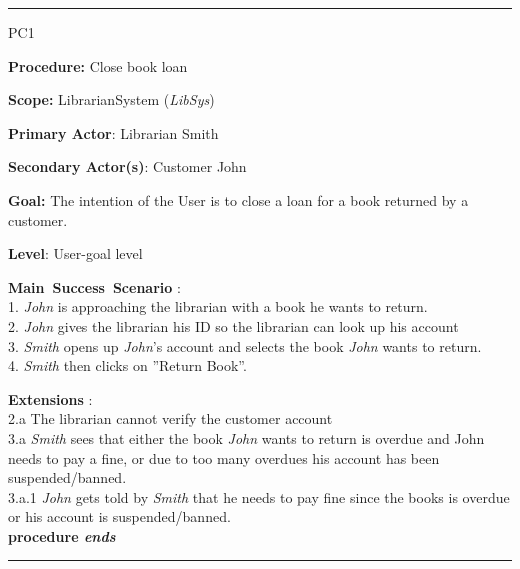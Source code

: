\vspace{0.5cm}
\hrule
\begin{lyxlist}{PC1}
\small{
\item [\textbf{Procedure:}] Close book loan
\item [\textbf{Scope:}] LibrarianSystem (\emph{LibSys})
\item [\textbf{Primary Actor}:] Librarian Smith
\item [\textbf{Secondary Actor(s)}:] Customer John
\item [\textbf{Goal:}] The intention of the User is to close a loan for a book
returned by a customer.
\item [\textbf{Level}:] User-goal level
\item [\textbf{Main~Success~Scenario}]:\\
1. \emph{John} is approaching the librarian with a book he wants to return. \\
2. \emph{John} gives the librarian his ID so the librarian can look up his
account\\
3. \emph{Smith} opens up \emph{John}'s account and selects the book \emph{John}
wants to return.\\
4. \emph{Smith} then clicks on ''Return Book''.\\

\item [\textbf{Extensions}]:\\
2.a The librarian cannot verify the customer account\\
3.a \emph{Smith} sees that either the book \emph{John} wants to return is
overdue and John needs to pay a fine, or due to too many overdues his account
has been suspended/banned.\\
\hspace*{0.5cm} 3.a.1 \emph{John} gets told by \emph{Smith} that he needs to
pay fine since the books is overdue or his account is suspended/banned.\\
\hspace*{0.5cm} \textbf{procedure \emph{ends}}

}

\end{lyxlist}
\hrule


